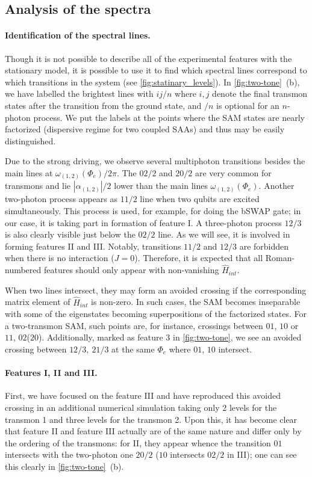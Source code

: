 \documentclass[%
 aip,
 amsmath,amssymb,
 reprint,%
]{revtex4-1}
\begin{document}
\subsection{Analysis of the spectra}

\paragraph{Identification of the spectral lines.} Though it is not possible to describe all of the experimental features with the stationary model, it is possible to use it to find which spectral lines correspond to which transitions in the system (see \autoref{fig:statinary_levels}). In \autoref{fig:two-tone}~(b), we have labelled the brightest lines with $ij/n$ where $i,j$ denote the final transmon states after the transition from the ground state, and $/n$ is optional for an $n$-photon process. We put the labels at the points where the SAM states are nearly factorized (dispersive regime for two coupled SAAs) and thus may be easily distinguished.

Due to the strong driving, we observe several multiphoton transitions besides the main lines at $\omega_{(1,2)}(\Phi_e)/2\pi$. The ${02/2}$ and ${20/2}$ are very common for transmons and lie $|\alpha_{(1,2)}|/2$ lower than the main lines $\omega_{(1,2)}(\Phi_e)$. Another two-photon process appears as $11/2$ line when two qubits are excited simultaneously. This process is used, for example, for doing the bSWAP gate\cite{poletto2012entanglement}; in our case, it is taking part in formation of feature I. A three-photon process $12/3$ is also clearly visible just below the $02/2$ line. As we will see, it is involved in forming features II and III. Notably, transitions $11/2$ and ${12/3}$ are forbidden when there is no interaction ($J=0$). Therefore, it is expected that all Roman-numbered features should only appear with non-vanishing $\hat H_{int}$.

When two lines intersect, they may form an avoided crossing if the corresponding matrix element of $\hat H_{int}$ is non-zero. In such cases, the SAM becomes inseparable with some of the eigenstates becoming superpositions of the factorized states. For a two-transmon SAM, such points are, for instance, crossings between ${01}$, ${10}$ or $ {11} $, $ {02} $($ {20} $). Additionally, marked as feature 3 in \autoref{fig:two-tone}, we see an avoided crossing between ${12}/3,\ {21}/3$ at the same $\Phi_e$ where ${01}$, ${10}$ intersect.


\paragraph{Features I, II and III.} First, we have focused on the feature III and have reproduced this avoided crossing in an additional numerical simulation taking only 2 levels for the transmon 1 and three levels for the transmon 2. Upon this, it has become clear that feature II and feature III actually are of the same nature and differ only by the ordering of the transmons: for II, they appear whence the transition ${01}$ intersects with the two-photon one ${20/2}$ (${10}$ intersects ${02/2}$ in III); one can see this clearly in \autoref{fig:two-tone}~(b).
\end{document}
